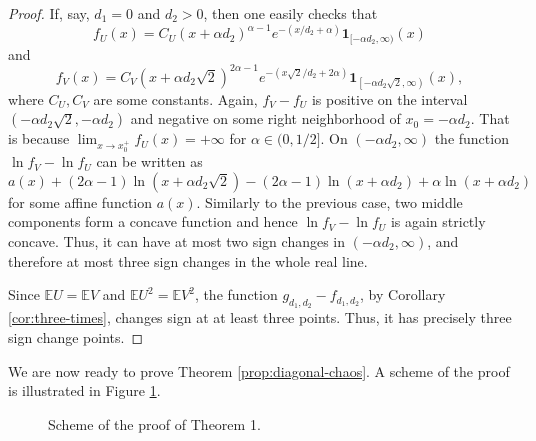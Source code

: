 \documentclass[11pt]{amsart}
\newcommand{\1}{\mathbf{1}}
\newcommand{\E}{\mathbb{E}}
\theoremstyle{definition}
\theoremstyle{definition}
\theoremstyle{remark}
\begin{document}
\begin{proof}
If, say, $d_1=0$ and $d_2>0$, then one easily checks that
\[
	f_U(x) = C_U (x+\alpha d_2)^{\alpha-1}e^{-(x/d_2+\alpha)}  \1_{[-\alpha d_2,\infty)}(x)
\]
and
\[ 
    f_{V}(x) = C_V \left(x+\alpha d_2 \sqrt2\right)^{2\alpha-1}e^{-\left(x\sqrt{2}/d_2+2\alpha\right)} \1_{\left[-\alpha d_2 \sqrt{2},\infty\right)}(x),
\]
where $C_U, C_V$ are some constants. Again, $f_{V}-f_{U}$ is positive on the interval $(-\alpha d_2 \sqrt{2}, -\alpha d_2)$ and negative on some right neighborhood of $x_0=-\alpha d_2$. That is because $\lim_{x \to x_0^+} f_{U}(x)=+\infty$ for $\alpha\in(0,1/2]$. On $(-\alpha d_2, \infty)$ the function $\ln f_{V}- \ln f_{U}$ can be written as
\[
    a(x) + (2\alpha-1)\ln(x+\alpha d_2 \sqrt2) - (2\alpha-1)\ln(x+\alpha d_2) + \alpha\ln(x+\alpha d_2)
\]
for some affine function $a(x)$. Similarly to the previous case, two middle components form a concave function and hence $\ln f_{V}- \ln f_{U}$ is again strictly concave. Thus, it can have at most two sign changes in $(-\alpha d_2,\infty)$, and therefore at most three sign changes in the whole real line.  

Since $\E U = \E V$ and $\E U^2 = \E V^2$, the function $g_{d_1, d_2}-f_{d_1, d_2}$, by Corollary \ref{cor:three-times}, changes sign at at least three points. Thus, it has  precisely three sign change points.
\end{proof}


We are now ready to prove Theorem \ref{prop:diagonal-chaos}. A scheme of the proof is illustrated in Figure \ref{fig:1}.

\begin{figure}[h]
\caption{Scheme of the proof of Theorem 1.}\label{fig:1}
\end{figure}
\end{document}
